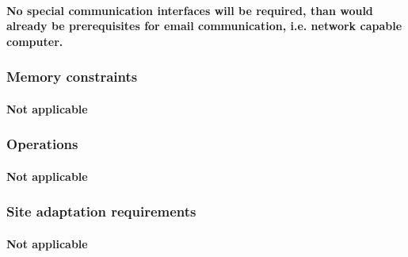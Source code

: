 \paragraph{No special communication interfaces will be required, than would already be prerequisites for email communication, i.e. network capable computer.}

\subsubsection{Memory constraints}
\paragraph{Not applicable}


\subsubsection{Operations}
%
\paragraph{Not applicable}

\subsubsection{Site adaptation requirements}
\paragraph{Not applicable}






